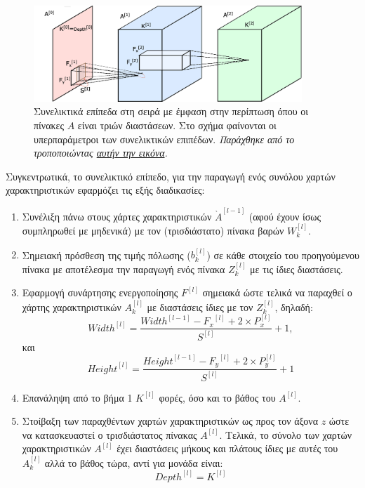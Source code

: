 \begin{figure}[h] 
  \centering
  \includegraphics[width=0.9\textwidth]{images/chapter theoritical background/Convolutional_Layers_of_a_Convolutional_Neural_Network.pdf}
  \caption{Συνελικτικά επίπεδα στη σειρά με έμφαση στην περίπτωση όπου οι πίνακες $A$ είναι τριών διαστάσεων. Στο σχήμα φαίνονται οι υπερπαράμετροι των συνελικτικών επιπέδων. \textit{Παράχθηκε από το \href{https://inkscape.org/}{} τροποποιώντας \href{https://commons.wikimedia.org/wiki/File:Convolutional_Layers_of_a_Convolutional_Neural_Network.svg}{αυτήν την εικόνα}.}}
  \label{fig:_conv3d}
\end{figure}
Συγκεντρωτικά, το συνελικτικό επίπεδο, για την παραγωγή ενός συνόλου χαρτών χαρακτηριστικών εφαρμόζει τις εξής διαδικασίες:
\begin{enumerate}
  \item Συνέλιξη πάνω στους χάρτες χαρακτηριστικών $\grave{A}^{[l-1]}$ (αφού έχουν ίσως συμπληρωθεί με μηδενικά) με τον (τρισδιάστατο) πίνακα βαρών $W^{[l]}_k$.
  \item Σημειακή πρόσθεση της τιμής πόλωσης ($b^{[l]}_k$) σε κάθε στοιχείο του προηγούμενου πίνακα με αποτέλεσμα την παραγωγή ενός πίνακα $Z^{[l]}_k$ με τις ίδιες διαστάσεις.
  \item Εφαρμογή συνάρτησης ενεργοποίησης $F^{[l]}$ σημειακά ώστε τελικά να παραχθεί ο χάρτης χαρακτηριστικών $A^{[l]}_k$ με διαστάσεις ίδιες με τον $Z^{[l]}_k$, δηλαδή: 
  \begin{equation}
  {Width}^{[l]}= \frac{{Width}^{[l-1]}-{F_x}^{[l]}+2\times P^{[l]}_x}{S^{[l]}} + 1,
  \end{equation}
  και
  \begin{equation}
    {Height}^{[l]}=\frac{{Height}^{[l-1]}-{F_y}^{[l]}+2\times P^{[l]}_y}{S^{[l]}} + 1
  \end{equation}
  \item Επανάληψη από το βήμα 1 $K^{[l]}$ φορές, όσο και το βάθος του $A^{[l]}$.
  \item Στοίβαξη των παραχθέντων χαρτών χαρακτηριστικών ως προς τον άξονα $z$ ώστε να κατασκευαστεί ο τρισδιάστατος πίνακας $A^{[l]}$. Τελικά, το σύνολο των χαρτών χαρακτηριστικών $A^{[l]}$ έχει διαστάσεις μήκους και πλάτους ίδιες με αυτές του $A^{[l]}_k$ αλλά το βάθος τώρα, αντί για μονάδα είναι:
  \begin{equation}
    {Depth}^{[l]}=K^{[l]}
  \end{equation}
\end{enumerate}
